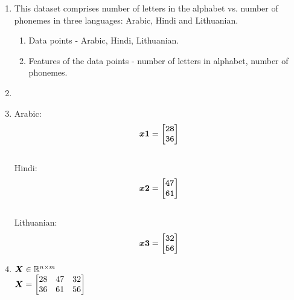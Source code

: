 \begin{solution}
   \color{blue}
   
   \begin{enumerate}
       \item This dataset comprises number of letters in the alphabet vs. number of phonemes in three languages: Arabic, Hindi and Lithuanian.
       
       \begin{enumerate}
            \item Data points - Arabic, Hindi, Lithuanian.
           \item Features of the data points - number of letters in alphabet, number of phonemes.
       \end{enumerate}
       
       \item 

       \item
       Arabic:\\
     $$\boldsymbol{x1} = \begin{bmatrix} \texttt{28} \\  \texttt{36} \end{bmatrix} $$ \\
     Hindi:\\
     $$\boldsymbol{x2} = \begin{bmatrix} \texttt{47} \\  \texttt{61} \end{bmatrix} $$ \\
     Lithuanian:\\
     $$\boldsymbol{x3} = \begin{bmatrix} \texttt{32} \\  \texttt{56} \end{bmatrix} $$
     
       \item
    $\boldsymbol{X} \in \mathbb{R}^{n\times m}$\\
    $\boldsymbol{X} = \begin{bmatrix} 28 & 47 & 32 \\ 36 & 61 & 56 \end{bmatrix}$
   \end{enumerate}
\end{solution}

